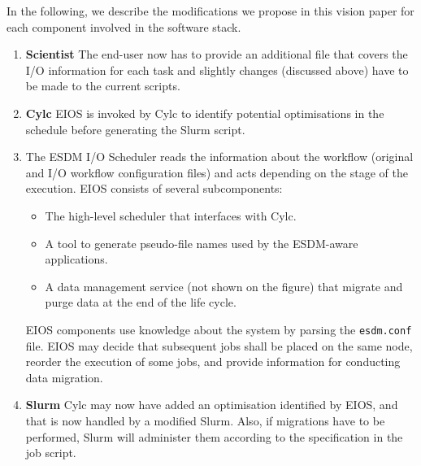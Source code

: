\documentclass{superfri}
\newcommand{\jk}[1]{\todo[inline]{JK: #1}}
\newcommand{\lr}[1]{\textcolor{cyan}{LR: #1}}
\newcommand{\hh}[1]{\textcolor{blue}{HuangHua: #1}}
\begin{document}
In the following, we describe the modifications we propose in this vision paper for each component involved in the software stack.


\begin{enumerate}

  \item \textbf{Scientist} The end-user now has to provide an additional file that covers the I/O information for each task and slightly changes (discussed above) have to be made to the current scripts.

  \item \textbf{Cylc} EIOS is invoked by Cylc to identify potential optimisations in the schedule before generating the Slurm script.

  \item \textbf{\color{red}{EIOS}} The ESDM I/O Scheduler reads the information about the workflow (original and I/O workflow configuration files) and acts depending on the stage of the execution.
  EIOS consists of several subcomponents:
    \begin{itemize}

      \item The high-level scheduler that interfaces with Cylc.

      \item A tool to generate pseudo-file names used by the ESDM-aware applications.

      \item A data management service (not shown on the figure) that migrate and purge data at the end of the life cycle.
    \end{itemize}
  EIOS components use knowledge about the system by parsing the \texttt{esdm.conf} file.
  EIOS may decide that subsequent jobs shall be placed on the same node, reorder the execution of some jobs, and provide information for conducting data migration.

  \item \textbf{Slurm}
  Cylc may now have added an optimisation identified by EIOS, and that is now handled by a modified Slurm.
  Also, if migrations have to be performed, Slurm will administer them according to the specification in the job script.


\end{enumerate}
\end{document}
